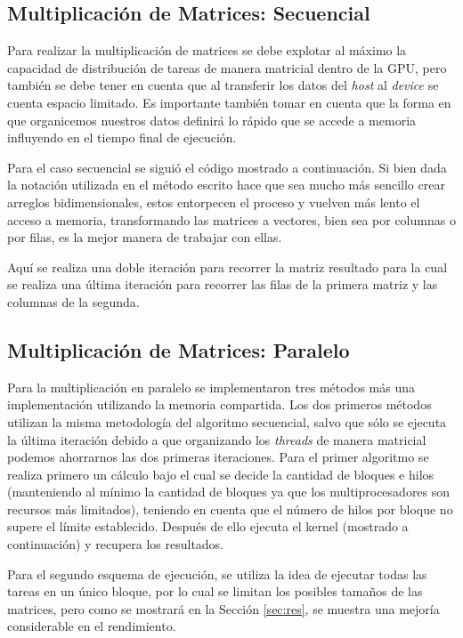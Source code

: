 \documentclass{article}
\begin{document}
\subsection{Multiplicación de Matrices: Secuencial}
Para realizar la multiplicación de matrices se debe explotar al máximo la capacidad de distribución de tareas de manera matricial dentro de la GPU, pero también se debe tener en cuenta que al transferir los datos del \textit{host} al \textit{device} se cuenta espacio limitado. Es importante también tomar en cuenta que la forma en que organicemos nuestros datos definirá lo rápido que se accede a memoria influyendo en el tiempo final de ejecución. 

Para el caso secuencial se siguió el código mostrado a continuación. Si bien dada la notación utilizada en el método escrito hace que sea mucho más sencillo crear arreglos bidimensionales, estos entorpecen el proceso y vuelven más lento el acceso a memoria, transformando las matrices a vectores, bien sea por columnas o por filas, es la mejor manera de trabajar con ellas.




Aquí se realiza una doble iteración para recorrer la matriz resultado para la cual se realiza una última iteración para recorrer las filas de la primera matriz y las columnas de la segunda.

\subsection{Multiplicación de Matrices: Paralelo}
Para la multiplicación en paralelo se implementaron tres métodos más una implementación utilizando la memoria compartida. Los dos primeros métodos utilizan la misma metodología del algoritmo secuencial, salvo que sólo se ejecuta la última iteración debido a que organizando los \textit{threads} de manera matricial podemos ahorrarnos las dos primeras iteraciones. Para el primer algoritmo se realiza primero un cálculo bajo el cual se decide la cantidad de bloques e hilos (manteniendo al mínimo la cantidad de bloques ya que los multiprocesadores son recursos más limitados), teniendo en cuenta que el número de hilos por bloque no supere el límite establecido. Después de ello ejecuta el kernel (mostrado a continuación) y recupera los resultados.



Para el segundo esquema de ejecución, se utiliza la idea de ejecutar todas las tareas en un único bloque, por lo cual se limitan los posibles tamaños de las matrices, pero como se mostrará en la Sección \ref{sec:res}, se muestra una mejoría considerable en el rendimiento.
\end{document}
